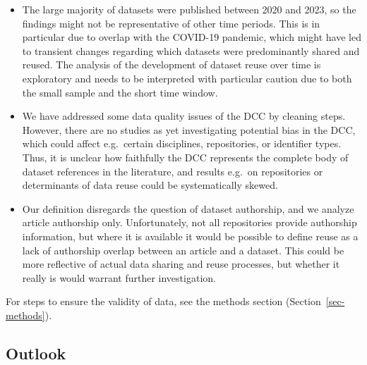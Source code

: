 \documentclass[
  letterpaper,
  DIV=11,
  numbers=noendperiod]{scrartcl}
\begin{document}
\begin{itemize}
  but it doesn't have to be the first one.
\item
  The large majority of datasets were published between 2020 and 2023,
  so the findings might not be representative of other time periods.
  This is in particular due to overlap with the COVID-19 pandemic, which
  might have led to transient changes regarding which datasets were
  predominantly shared and reused. The analysis of the development of
  dataset reuse over time is exploratory and needs to be interpreted
  with particular caution due to both the small sample and the short
  time window.
\item
  We have addressed some data quality issues of the DCC by cleaning
  steps. However, there are no studies as yet investigating potential
  bias in the DCC, which could affect e.g.~certain disciplines,
  repositories, or identifier types. Thus, it is unclear how faithfully
  the DCC represents the complete body of dataset references in the
  literature, and results e.g.~on repositories or determinants of data
  reuse could be systematically skewed.
\item
  Our definition disregards the question of dataset authorship, and we
  analyze article authorship only. Unfortunately, not all repositories
  provide authorship information, but where it is available it would be
  possible to define reuse as a lack of authorship overlap between an
  article and a dataset. This could be more reflective of actual data
  sharing and reuse processes, but whether it really is would warrant
  further investigation.
\end{itemize}

For steps to ensure the validity of data, see the methods section
(Section~\ref{sec-methods}).

\subsection{Outlook}\label{sec-discussion-outlook}
\end{document}
